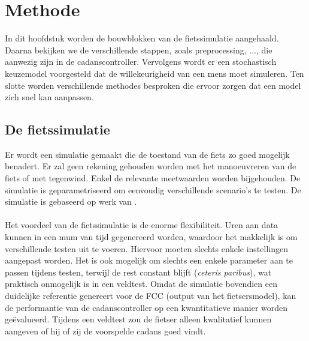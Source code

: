 \chapter{Methode}
In dit hoofdstuk worden de bouwblokken van de fietssimulatie aangehaald. Daarna bekijken we de verschillende stappen, zoals preprocessing, ..., die aanwezig zijn in de cadanscontroller. Vervolgens wordt er een stochastisch keuzemodel voorgesteld dat de willekeurigheid van een mens moet simuleren. Ten slotte worden verschillende methodes besproken die ervoor zorgen dat een model zich snel kan aanpassen.
\section{De fietssimulatie}
Er wordt een simulatie gemaakt die de toestand van de fiets zo goed mogelijk benadert. Er zal geen rekening gehouden worden met het manoeuvreren van de fiets of met tegenwind. Enkel de relevante meetwaarden worden bijgehouden. De simulatie is geparametriseerd om eenvoudig verschillende scenario’s te testen. De simulatie is gebaseerd op werk van \cite{hardware implementation}.
\\\\
Het voordeel van de fietssimulatie is de enorme flexibiliteit. Uren aan data kunnen in een mum van tijd gegenereerd worden, waardoor het makkelijk is om verschillende testen uit te voeren. Hiervoor moeten slechts enkele instellingen aangepast worden. Het is ook mogelijk om slechts een enkele parameter aan te passen tijdens testen, terwijl de rest constant blijft (\textit{ceteris paribus}), wat praktisch onmogelijk is in een veldtest. Omdat de simulatie bovendien een duidelijke referentie genereert voor de FCC (output van het fietsersmodel), kan de performantie van de cadanscontroller op een kwantitatieve manier worden geëvalueerd. Tijdens een veldtest zou de fietser alleen kwalitatief kunnen aangeven of hij of zij de voorspelde cadans goed vindt. 
